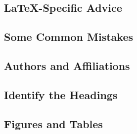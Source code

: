 \documentclass[conference]{IEEEtran}
\begin{document}
\subsection{\LaTeX-Specific Advice}


\subsection{Some Common Mistakes}\label{SCM}

\subsection{Authors and Affiliations}

\subsection{Identify the Headings}


\subsection{Figures and Tables}




\color{red}
\end{document}
